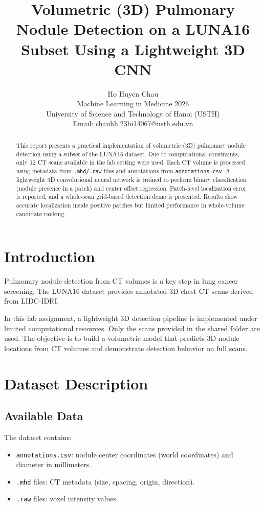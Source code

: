 \documentclass[conference]{IEEEtran}
\title{Volumetric (3D) Pulmonary Nodule Detection on a LUNA16 Subset Using a Lightweight 3D CNN}
\author{
Ho Huyen Chau\\
Machine Learning in Medicine 2026\\
University of Science and Technology of Hanoi (USTH)\\
Email: chauhh.23bi14067@usth.edu.vn
}
\begin{document}
\maketitle

\begin{abstract}
This report presents a practical implementation of volumetric (3D) pulmonary nodule detection using a subset of the LUNA16 dataset. Due to computational constraints, only 12 CT scans available in the lab setting were used. Each CT volume is processed using metadata from \texttt{.mhd/.raw} files and annotations from \texttt{annotations.csv}. A lightweight 3D convolutional neural network is trained to perform binary classification (nodule presence in a patch) and center offset regression. Patch-level localization error is reported, and a whole-scan grid-based detection demo is presented. Results show accurate localization inside positive patches but limited performance in whole-volume candidate ranking.
\end{abstract}

\section{Introduction}

Pulmonary nodule detection from CT volumes is a key step in lung cancer screening. The LUNA16 dataset provides annotated 3D chest CT scans derived from LIDC-IDRI. 

In this lab assignment, a lightweight 3D detection pipeline is implemented under limited computational resources. Only the scans provided in the shared folder are used. The objective is to build a volumetric model that predicts 3D nodule locations from CT volumes and demonstrate detection behavior on full scans.

\section{Dataset Description}

\subsection{Available Data}

The dataset contains:

\begin{itemize}
    \item \texttt{annotations.csv}: nodule center coordinates (world coordinates) and diameter in millimeters.
    \item \texttt{.mhd} files: CT metadata (size, spacing, origin, direction).
    \item \texttt{.raw} files: voxel intensity values.
\end{itemize}
\end{document}
